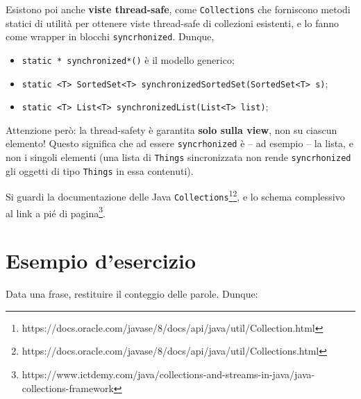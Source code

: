 \documentclass[\fontsizeclass,twocolumn]{\classname}
\theoremstyle{definition}
\theoremstyle{definition}
\begin{document}
Esistono poi anche \textbf{viste thread\--safe}, come \texttt{Collections} che
forniscono metodi statici di utilità per ottenere viste thread\--safe di
collezioni esistenti, e lo fanno come wrapper in blocchi \texttt{syncrhonized}. Dunque,
\begin{itemize}
    \item \texttt{static * synchronized*()} è il modello generico;
    \item \texttt{static <T> SortedSet<T> synchronizedSortedSet(SortedSet<T> s)};
    \item \texttt{static <T> List<T> synchronizedList(List<T> list)};
\end{itemize}

Attenzione però: la thread\--safety è garantita \textbf{solo sulla view}, non
su ciascun elemento! Questo significa che ad essere \texttt{syncrhonized} è --
ad esempio -- la lista, e non i singoli elementi (una lista di \texttt{Things}
sincronizzata non rende \texttt{syncrhonized} gli oggetti di tipo
\texttt{Things} in essa contenuti).

Si guardi la documentazione delle Java \texttt{Collections}\footnote{https://docs.oracle.com/javase/8/docs/api/java/util/Collection.html}\footnote{https://docs.oracle.com/javase/8/docs/api/java/util/Collections.html}, e lo schema
complessivo al link a pié di
pagina\footnote{https://www.ictdemy.com/java/collections-and-streams-in-java/java-collections-framework}.

\section{Esempio d'esercizio}

Data una frase, restituire il conteggio delle parole. Dunque:
\end{document}
